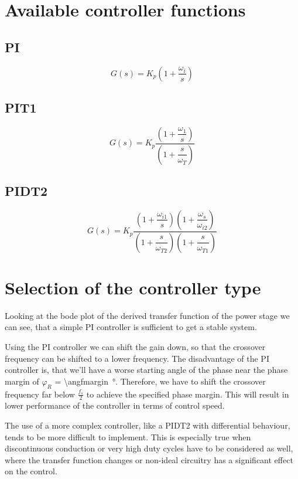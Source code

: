 
\section{Available controller functions}

\subsection{PI}
\[
	G(s)
	= K_p \left(1 + \dfrac{\omega_i}{s} \right)
\]

\subsection{PIT1}
\[
	G(s)
	= K_p \dfrac{
		\left(1 + \dfrac{\omega_{1}}{s}\right)
	}{ 
		\left(1 + \dfrac{s}{\omega_{T}} \right)
	}
\]
\subsection{PIDT2}

\[
	G(s)
	= K_p \dfrac{
		\left(1 + \dfrac{\omega_{i1}}{s}\right) \left(1 + \dfrac{\omega_{s}}{\omega_{i2}}\right)
	}{ 
		\left(1 + \dfrac{s}{\omega_{T2}} \right) \left(1 + \dfrac{s}{\omega_{T1}} \right)
	}
\]

\section{Selection of the controller type}
Looking at the bode plot of the derived transfer function of the power stage
we can see, that a simple PI controller is sufficient to get a stable system.

Using the PI controller we can shift the gain down, so that the crossover
frequency can be shifted to a lower frequency. The disadvantage of the PI
controller is, that we'll have a worse starting angle of the phase near the
phase margin of $\varphi_R$ = \SI{\angfmargin}{\degree}. Therefore, we have to
shift the crossover frequency far below $\frac{f_s}{2}$ to achieve the specified
phase margin. This will result in lower performance of the controller in terms of
control speed.

The use of a more complex controller, like a PIDT2 with differential behaviour,
tends to be more difficult to implement. This is especially true when 
discontinuous conduction or very high duty cycles have to be considered as well,
where the transfer function changes or non-ideal circuitry has a significant
effect on the control.

